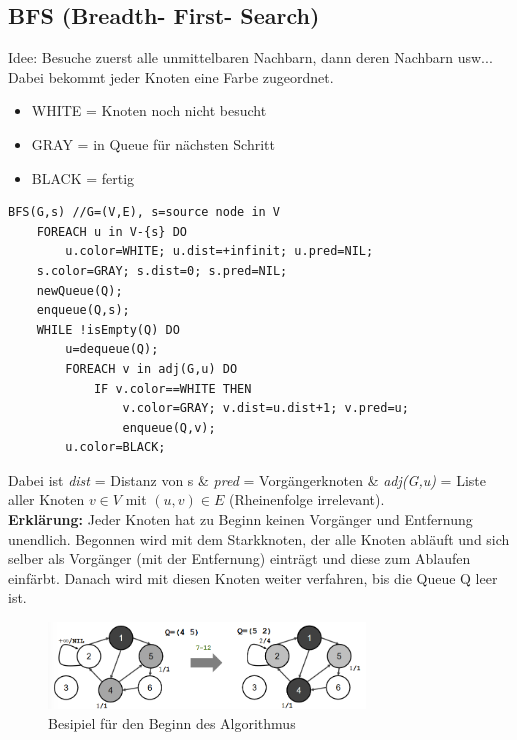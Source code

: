 \documentclass{article}
\begin{document}
        \subsection{BFS (Breadth- First- Search)}
            Idee: Besuche zuerst alle unmittelbaren Nachbarn, dann deren Nachbarn usw...\\
            Dabei bekommt jeder Knoten eine Farbe zugeordnet.
            \begin{itemize}
                \item WHITE = Knoten noch nicht besucht
                \item GRAY = in Queue für nächsten Schritt
                \item BLACK = fertig
            \end{itemize}
            \begin{lstlisting}[style=pseudocode]
BFS(G,s) //G=(V,E), s=source node in V
    FOREACH u in V-{s} DO
        u.color=WHITE; u.dist=+infinit; u.pred=NIL;
    s.color=GRAY; s.dist=0; s.pred=NIL;
    newQueue(Q);
    enqueue(Q,s);
    WHILE !isEmpty(Q) DO
        u=dequeue(Q);
        FOREACH v in adj(G,u) DO
            IF v.color==WHITE THEN
                v.color=GRAY; v.dist=u.dist+1; v.pred=u;
                enqueue(Q,v);
        u.color=BLACK;
            \end{lstlisting}
            Dabei ist \textit{dist} = Distanz von s \& \textit{pred} = Vorgängerknoten \& \textit{adj(G,u)} = Liste aller Knoten $v \in V$ mit $(u,v) \in E$ (Rheinenfolge irrelevant).\\
            \textbf{Erklärung:} Jeder Knoten hat zu Beginn keinen Vorgänger und Entfernung unendlich. Begonnen wird mit dem Starkknoten, der alle Knoten abläuft und sich selber als Vorgänger (mit der Entfernung) einträgt und diese zum Ablaufen einfärbt.
            Danach wird mit diesen Knoten weiter verfahren, bis die Queue Q leer ist.\\
            \begin{figure}[ht]
                \centering
                \includegraphics[width=0.75\textwidth]{Bilder/BFSAlg.png}
                \caption{Besipiel für den Beginn des Algorithmus}
                \label{fig:BFSAlg}
            \end{figure}\\
\end{document}
